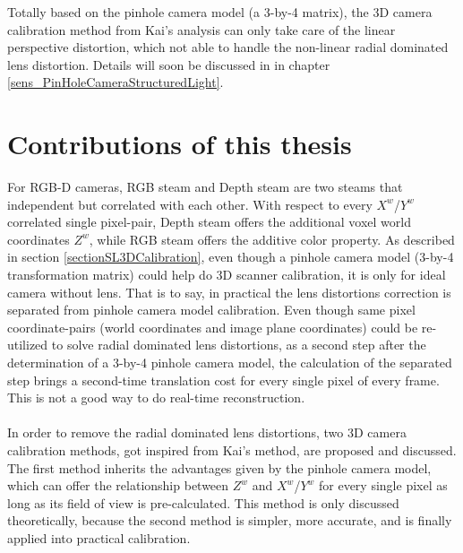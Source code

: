 Totally based on the pinhole camera model (a 3-by-4 matrix), the 3D camera calibration method from Kai's analysis can only take care of the linear perspective distortion, which not able to handle the non-linear radial dominated lens distortion. Details will soon be discussed in in chapter \ref{sens_PinHoleCameraStructuredLight}. %
%
%
%
\section{Contributions of this thesis}
For RGB-D cameras, RGB steam and Depth steam are two steams that independent but correlated with each other. With respect to every \(X^{w}\)/\(Y^{w}\) correlated single pixel-pair, Depth steam offers the additional voxel world coordinates \(Z^{w}\), while RGB steam offers the additive color property.
As described in section \ref{sectionSL3DCalibration}, even though a pinhole camera model (3-by-4 transformation matrix) could help do 3D scanner calibration, it is only for ideal camera without lens. That is to say, in practical the lens distortions correction is separated from pinhole camera model calibration. Even though same pixel coordinate-pairs (world coordinates and image plane coordinates) could be re-utilized to solve radial dominated lens distortions, as a second step after the determination of a 3-by-4 pinhole camera model, the calculation of the separated step brings a second-time translation cost for every single pixel of every frame. This is not a good way to do real-time reconstruction. %
\\\\%
In order to remove the radial dominated lens distortions, two 3D camera calibration methods, got inspired from Kai's method, are proposed and discussed. The first method inherits the advantages given by the pinhole camera model, which can offer the relationship between \(Z^{w}\) and \(X^{w}\)/\(Y^{w}\) for every single pixel as long as its field of view is pre-calculated. This method is only discussed theoretically, because the second method is simpler, more accurate, and is finally applied into practical calibration.%
